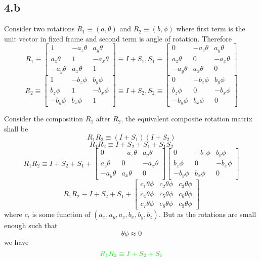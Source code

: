 \documentclass[12pt]{article}
\begin{document}
\subsection*{4.b}
Consider two rotations $R_1 \equiv (a, \theta)$ and $R_2 \equiv (b, \phi)$ where first term is the unit vector in fixed frame and second term is angle of rotation.
Therefore
\[
  R_1 \equiv
  \begin{bmatrix}
    1 & -a_z\theta & a_y\theta\\
     a_z\theta & 1 & -a_x\theta \\
     -a_y\theta & a_x\theta & 1
  \end{bmatrix}
  \equiv
  I + S_1
  ,
  S_1 \equiv
  \begin{bmatrix}
    0 & -a_z\theta & a_y\theta\\
     a_z\theta & 0 & -a_x\theta \\
     -a_y\theta & a_x\theta & 0
  \end{bmatrix}
\]
\[
  R_2 \equiv
  \begin{bmatrix}
    1 & -b_z\phi & b_y\phi\\
     b_z\phi & 1 & -b_x\phi \\
     -b_y\phi & b_x\phi & 1
  \end{bmatrix}
  \equiv
  I + S_2
  ,
  S_2 \equiv
  \begin{bmatrix}
    0 & -b_z\phi & b_y\phi\\
     b_z\phi & 0 & -b_x\phi \\
     -b_y\phi & b_x\phi & 0
  \end{bmatrix}
\]

Consider the composition $R_1$ after $R_2$, the equivalent composite rotation matrix shall be
\[
  R_1 R_2 \equiv (I + S_1) (I + S_2)
\]
\[
  R_1 R_2 \equiv I + S_2 + S_1 + S_1S_2
\]
\[
  R_1 R_2 \equiv I + S_2 + S_1 +
  \begin{bmatrix}
    0 & -a_z\theta & a_y\theta\\
     a_z\theta & 0 & -a_x\theta \\
     -a_y\theta & a_x\theta & 0
  \end{bmatrix}
  \begin{bmatrix}
    0 & -b_z\phi & b_y\phi\\
     b_z\phi & 0 & -b_x\phi \\
     -b_y\phi & b_x\phi & 0
  \end{bmatrix}
\]
\[
  R_1 R_2 \equiv I + S_2 + S_1 +
  \begin{bmatrix}
    c_1\theta\phi & c_2\theta\phi & c_3\theta\phi \\
    c_4\theta\phi & c_5\theta\phi & c_6\theta\phi \\
    c_7\theta\phi & c_8\theta\phi & c_9\theta\phi
  \end{bmatrix}
\]
where $c_i$ is some function of $(a_x, a_y, a_z, b_x, b_y, b_z)$. But as the rotations are small enough such that
\[
  \theta\phi \approx 0
\]
we have
\[
  {\color{green} R_1 R_2 \equiv I + S_2 + S_1}
\]
\end{document}
